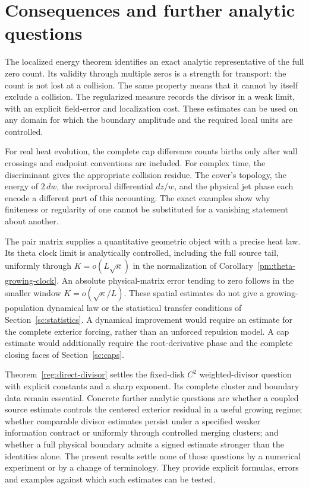 \section{Consequences and further analytic questions}
\label{end:section}

The localized energy theorem identifies an exact analytic representative
of the full zero count. Its validity through multiple zeros is a strength
for transport: the count is not lost at a collision. The same property
means that it cannot by itself exclude a collision. The regularized
measure records the divisor in a weak limit, with an explicit field-error
and localization cost. These estimates can be used on any domain for
which the boundary amplitude and the required local units are controlled.

For real heat evolution, the complete cap difference counts births only
after wall crossings and endpoint conventions are included. For complex
time, the discriminant gives the appropriate collision residue. The
cover's topology, the energy of $2\,dw$, the reciprocal differential
$dz/w$, and the physical jet phase each encode a different part of this
accounting. The exact examples show why finiteness or regularity of one
cannot be substituted for a vanishing statement about another.

The pair matrix supplies a quantitative geometric object with a precise
heat law. Its theta clock limit is analytically controlled, including
the full source tail, uniformly through $K=o(L\sqrt\kappa)$ in the
normalization of Corollary~\ref{pm:theta-growing-clock}. An absolute
physical-matrix error tending to zero follows in the smaller window
$K=o(\sqrt\kappa/L)$. These spatial estimates do not give a
growing-population dynamical law or the statistical transfer conditions
of Section~\ref{sc:statistics}. A dynamical improvement would
require an estimate for the complete exterior forcing, rather than an
unforced repulsion model. A cap estimate would additionally require the
root-derivative phase and the complete closing faces of
Section~\ref{sc:caps}.

Theorem~\ref{reg:direct-divisor} settles the fixed-disk $C^2$
weighted-divisor question with explicit constants and a sharp exponent.
Its complete cluster and boundary data remain essential.
Concrete further analytic questions are whether a coupled
source estimate controls the centered exterior residual in a useful
growing regime; whether comparable divisor estimates persist under a specified weaker
information contract or uniformly through controlled merging clusters; and
whether a full physical boundary admits a signed estimate stronger than
the identities alone. The present results settle none of those questions
by a numerical experiment or by a change of terminology. They provide
explicit formulas, errors and examples against which such estimates can
be tested.
